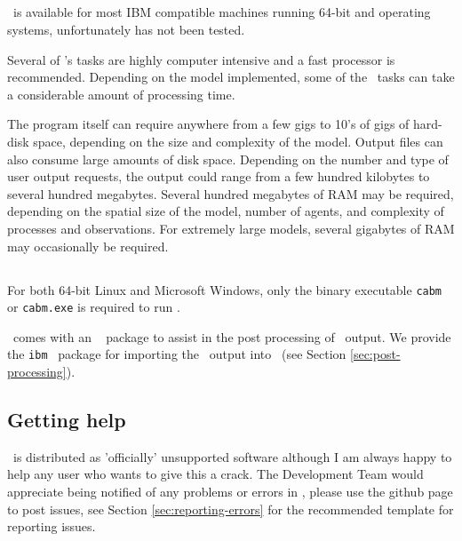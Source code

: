 \subsection{}
\IBM\ is available for most IBM compatible machines running 64-bit  and  operating systems, unfortunately  has not been tested.

Several of \IBM 's tasks are highly computer intensive and a fast processor is recommended. Depending on the model implemented, some of the \IBM\ tasks can take a considerable amount of processing time.

The program itself can require anywhere from a few gigs to 10's of gigs of hard-disk space, depending on the size and complexity of the model. Output files can also consume large amounts of disk space. Depending on the number and type of user output requests, the output could range from a few hundred kilobytes to several hundred megabytes. Several hundred megabytes of RAM may be required, depending on the spatial size of the model, number of agents, and complexity of processes and observations. For extremely large models, several gigabytes of RAM may occasionally be required. 

\subsection{}

For both 64-bit Linux and Microsoft Windows, only the binary executable \texttt{cabm} or \texttt{cabm.exe} is required to run \IBM .


\IBM\ comes with an \href{http://www.r-project.org}{\R}\ \citep{R} package to assist in the post processing of \IBM\ output. We provide the \texttt{ibm} \R\ package for importing the \IBM\ output into \R\ (see Section \ref{sec:post-processing}).

\subsection{Getting help}

\IBM\ is distributed as 'officially' unsupported software although I am always happy to help any user who wants to give this a crack. The Development Team would appreciate being notified of any problems or errors in \IBM , please use the github page to post issues, see Section \ref{sec:reporting-errors} for the recommended template for reporting issues.

